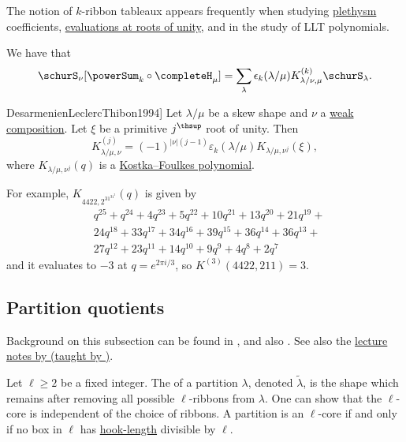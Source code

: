 The notion of $k$-ribbon tableaux appears frequently when studying \hyperref[plethysm]{plethysm} coefficients,
\hyperref[prelimEvalAtRootsOfUnity]{evaluations at roots of unity}, and in
the study of LLT polynomials.

We have \cite[p. 29]{DesarmenienLeclercThibon1994} that
\[
 \schurS_\nu[ \powerSum_k \circ \completeH_\mu ] = \sum_{\lambda}
 \epsilon_k(\lambda/\mu) K^{(k)}_{\lambda/\nu,\mu} \schurS_\lambda.
\]


\begin{theorem}[See \cite[p.29]{DesarmenienLeclercThibon1994}]
Let $\lambda/\mu$ be a skew shape and $\nu$ a
\hyperref[weakCompositionDefinition]{weak composition}.
Let $\xi$ be a primitive $j^\thsup$ root of unity.
Then
 \[
  K^{(j)}_{\lambda/\mu,\nu} =  (-1)^{|\nu|(j-1)}\varepsilon_k(\lambda/\mu) K_{\lambda/\mu,\nu^j}(\xi),
 \]
where $K_{\lambda/\mu,\nu^j}(q)$ is a \hyperref[kostkaFoulkes]{Kostka--Foulkes polynomial}.
\end{theorem}
For example, $K_{4422,2^31^31^3}(q)$ is given by
\begin{align*}
 &q^{25}+q^{24}+4 q^{23}+5 q^{22}+10 q^{21}+13 q^{20}+21 q^{19}+ \\
 &24 q^{18}+33 q^{17}+34 q^{16}+39 q^{15}+36 q^{14}+36 q^{13}+ \\
 &27 q^{12}+23 q^{11}+14 q^{10}+9 q^9+4 q^8+2 q^7
\end{align*}
and it evaluates to $-3$ at $q=e^{2\pi i/3}$, so $K^{(3)}(4422,211)=3$.



\subsection[partitionQuotient]{Partition quotients}

Background on this subsection can be found in \cite[p.12]{Macdonald1995},
and also \cite[Chapter 2.7]{JamesKerber1984}.
See also the \href{https://ghseeli.github.io/grad-school-writings/class-notes/algebraic-combinatorics.pdf}{lecture notes by  (taught by )}.

Let $\ell \geq 2$ be a fixed integer. The  of 
a partition $\lambda$, denoted $\widetilde{\lambda}$,
is the shape which remains after removing all possible $\ell$-ribbons from $\lambda$.
One can show that the $\ell$-core is independent of the choice of ribbons.
A partition is an $\ell$-core if and only if no 
box in $\ell$ has \hyperref[partitionCores]{hook-length} divisible by $\ell$.


